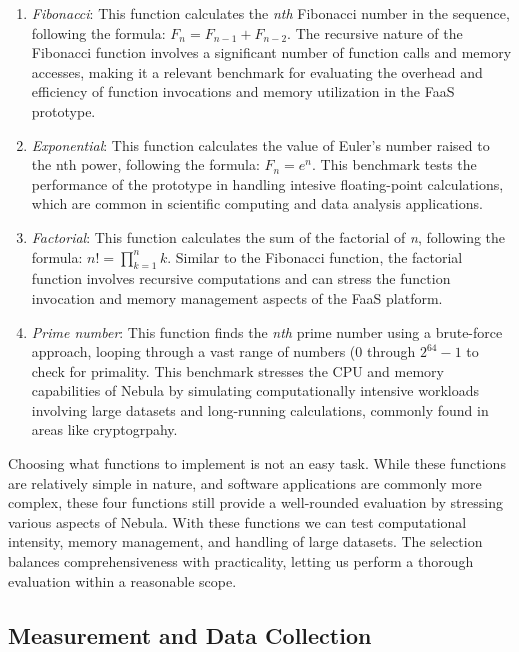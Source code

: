 \documentclass[
  table]{report}
\providecommand{\tightlist}{%
  \setlength{\itemsep}{0pt}\setlength{\parskip}{0pt}}
\begin{document}
\begin{enumerate}
\def\labelenumi{\arabic{enumi}.}
\tightlist
\item
  \emph{Fibonacci}: This function calculates the \emph{nth} Fibonacci
  number in the sequence, following the formula:
  \(F_n = F_{n-1} + F_{n-2}\). The recursive nature of the Fibonacci
  function involves a significant number of function calls and memory
  accesses, making it a relevant benchmark for evaluating the overhead
  and efficiency of function invocations and memory utilization in the
  \ac{FaaS} prototype.
\item
  \emph{Exponential}: This function calculates the value of Euler's
  number raised to the nth power, following the formula: \(F_n = e^n\).
  This benchmark tests the performance of the prototype in handling
  intesive floating-point calculations, which are common in scientific
  computing and data analysis applications.
\item
  \emph{Factorial}: This function calculates the sum of the factorial of
  \emph{n}, following the formula: \(n! = \prod_{k=1}^n k\). Similar to
  the Fibonacci function, the factorial function involves recursive
  computations and can stress the function invocation and memory
  management aspects of the \ac{FaaS} platform.
\item
  \emph{Prime number}: This function finds the \emph{nth} prime number
  using a brute-force approach, looping through a vast range of numbers
  (0 through \(2^{64} - 1\) to check for primality. This benchmark
  stresses the CPU and memory capabilities of Nebula by simulating
  computationally intensive workloads involving large datasets and
  long-running calculations, commonly found in areas like cryptogrpahy.
\end{enumerate}

Choosing what functions to implement is not an easy task. While these
functions are relatively simple in nature, and software applications are
commonly more complex, these four functions still provide a well-rounded
evaluation by stressing various aspects of Nebula. With these functions
we can test computational intensity, memory management, and handling of
large datasets. The selection balances comprehensiveness with
practicality, letting us perform a thorough evaluation within a
reasonable scope.

\subsection{Measurement and Data Collection}
\label{sect:measure_data_collect}
\end{document}

